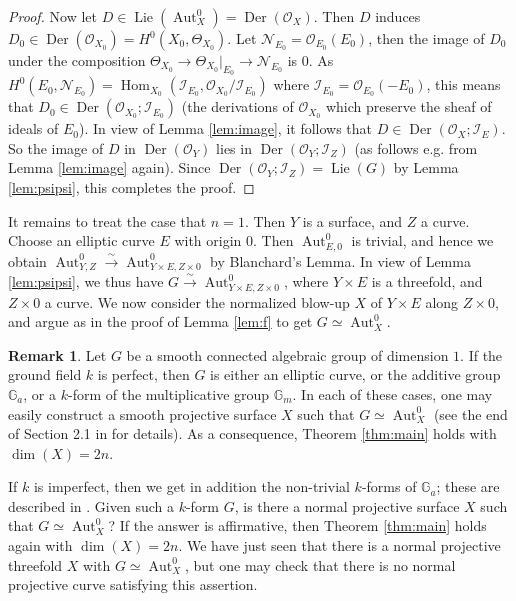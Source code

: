 \documentclass[oneside, 12pt]{amsart}
\theoremstyle{definition}
\newtheorem{remark}[theorem]{Remark}
\theoremstyle{remark}
\newcommand{\GG}{\mathbb{G}}
\newcommand{\catI}{\mathcal{I}}
\newcommand{\catN}{\mathcal{N}}
\newcommand{\catO}{\mathcal{O}}
\newcommand{\Aut}{\operatorname{Aut}}
\newcommand{\Der}{\operatorname{Der}}
\newcommand{\Hom}{\operatorname{Hom}}
\newcommand{\Lie}{\operatorname{Lie}}
\begin{document}
\begin{proof}
Now let $D \in \Lie(\Aut^0_X) = \Der(\catO_X)$. 
Then $D$ induces
$D_0 \in \Der(\catO_{X_0}) = H^0(X_0,\Theta_{X_0})$.
Let $\catN_{E_0} = \catO_{E_0}(E_0)$, then 
the image of $D_0$ under the composition
$\Theta_{X_0} \to \Theta_{X_0}\vert_{E_0}
\to \catN_{E_0}$ is $0$.
As 
$H^0(E_0,\catN_{E_0}) = \Hom_{X_0}
(\catI_{E_0},\catO_{X_0}/\catI_{E_0})$
where $\catI_{E_0} = \catO_{E_0}(-E_0)$,
this means that
$D_0 \in \Der(\catO_{X_0}; \catI_{E_0})$
(the derivations of $\catO_{X_0}$ which preserve
the sheaf of ideals of $E_0$).
In view of Lemma \ref{lem:image}, it follows that
$D \in \Der(\catO_X; \catI_E)$.
So the image of $D$ in $\Der(\catO_Y)$ lies
in $\Der(\catO_Y;\catI_Z)$ (as follows e.g. from
Lemma \ref{lem:image} again). Since 
$\Der(\catO_Y;\catI_Z) = \Lie(G)$ by 
Lemma \ref{lem:psipsi}, this completes the proof.
\end{proof}


It remains to treat the case that $n = 1$.
Then $Y$ is a surface, and $Z$ a curve.
Choose an elliptic curve $E$ with origin $0$.
Then $\Aut^0_{E,0}$ is trivial, and hence we obtain
$\Aut^0_{Y,Z} \stackrel{\sim}{\to}
\Aut^0_{Y \times E,Z \times 0}$ by Blanchard's
Lemma. In view of Lemma \ref{lem:psipsi},
we thus have 
$G \stackrel{\sim}{\to} 
\Aut^0_{Y \times E,Z \times 0}$,
where $Y \times E$ is a threefold, and 
$Z \times 0$ a curve. We now consider the
normalized blow-up $X$ of $Y \times E$ along 
$Z \times 0$, and argue as in the proof of 
Lemma \ref{lem:f} to get
$G \simeq \Aut^0_X$.


\begin{remark}
\label{rem:dim}
Let $G$ be a smooth connected algebraic group of
dimension $1$. If the ground field $k$ is perfect, 
then $G$ is either an elliptic curve, or 
the additive group $\GG_a$, or a $k$-form of 
the multiplicative group $\GG_m$. In each of these 
cases, one may easily construct a smooth projective 
surface $X$ such that $G \simeq \Aut^0_X$ 
(see the end of Section 2.1 in \cite{Brion 2014} 
for details). As a consequence, Theorem 
\ref{thm:main} holds with $\dim(X) = 2 n$.

If $k$ is imperfect, then we get in addition
the non-trivial $k$-forms of $\GG_a$; 
these are described in \cite{Russell 1970}. 
Given such a $k$-form $G$, 
is there a normal projective surface $X$
such that $G \simeq \Aut^0_X$? If the answer
is affirmative, then Theorem \ref{thm:main}
holds again with $\dim(X) = 2n$. We have 
just seen that there is a normal projective 
threefold $X$ with $G \simeq \Aut^0_X$, but 
one may check that there is no normal projective 
curve satisfying this assertion.
\end{remark}
\end{document}
